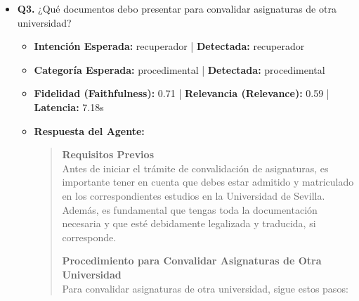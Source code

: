 \documentclass[12pt,a4paper,oneside]{report}
\begin{document}
\begin{itemize}
\begin{itemize}
\begin{itemize}
                  \item R.R. NORMAS DE MATRICULA GRADO Y MASTER UNIVERSITARIO 2025-2026.pdf (Página 12)
                  \item \href{https://institutodeidiomas.us.es/secretaria/matricula/anulacion-de-matricula}{Anulación de matrícula | Instituto de Idiomas}
                  \item R.R. NORMAS DE MATRICULA GRADO Y MASTER UNIVERSITARIO 2025-2026.pdf (Página 11)
                  \item \href{https://cat.us.es/matricula/guia-basica-de-anulacion-de-matricula-para-titulaciones-de-grado-y-master}{Guía básica de anulación de matrícula para titulaciones de Grado...}
                \end{itemize}
        \end{itemize}

  
\item \textbf{Q3.} ¿Qué documentos debo presentar para convalidar asignaturas de otra universidad? \\
        \begin{itemize}
          \item \textbf{Intención Esperada:} recuperador | \textbf{Detectada:} recuperador
          \item \textbf{Categoría Esperada:} procedimental | \textbf{Detectada:} procedimental
          \item \textbf{Fidelidad (Faithfulness):} 0.71 | \textbf{Relevancia (Relevance):} 0.59 | \textbf{Latencia:} 7.18s
          \item \textbf{{Respuesta del Agente:}} \\
                \begin{quote}

\noindent\textbf{Requisitos Previos}\\
Antes de iniciar el trámite de convalidación de asignaturas, es importante tener en cuenta que debes estar admitido y matriculado en los correspondientes estudios en la Universidad de Sevilla. Además, es fundamental que tengas toda la documentación necesaria y que esté debidamente legalizada y traducida, si corresponde.


\noindent\textbf{Procedimiento para Convalidar Asignaturas de Otra Universidad}\\
Para convalidar asignaturas de otra universidad, sigue estos pasos:


\end{quote}
\end{itemize}
\end{itemize}
\end{document}
